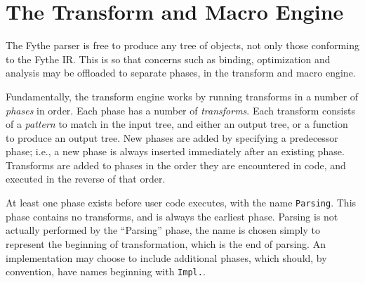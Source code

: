 \chapter{The Transform and Macro Engine}\label{chap:transformer}

The Fythe parser is free to produce any tree of objects, not only those
conforming to the Fythe IR. This is so that concerns such as binding,
optimization and analysis may be offloaded to separate phases, in the transform
and macro engine.

Fundamentally, the transform engine works by running transforms in a number of
\textit{phases} in order. Each phase has a number of \textit{transforms}. Each
transform consists of a \textit{pattern} to match in the input tree, and either
an output tree, or a function to produce an output tree. New phases are added
by specifying a predecessor phase; i.e., a new phase is always inserted
immediately after an existing phase. Transforms are added to phases in the
order they are encountered in code, and executed in the reverse of that order.

At least one phase exists before user code executes, with the name
\texttt{Parsing}. This phase contains no transforms, and is always the earliest
phase. Parsing is not actually performed by the ``Parsing'' phase, the name is
chosen simply to represent the beginning of transformation, which is the end of
parsing. An implementation may choose to include additional phases, which
should, by convention, have names beginning with \texttt{Impl.}.

